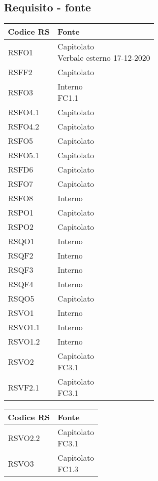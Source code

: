 {\subsection{Requisito - fonte}\label{RequisitiTracciamentoDeiRequisitiFonte}
\begin{center}
	\renewcommand{\arraystretch}{1.4}
	\begin{tabularx}{\textwidth}{ |X|X| }
		\hline
		\rowcolor{Melon}
		\textbf{Codice RS} & \textbf{Fonte}  \\
		\hline
RSFO1 & \makecell[tcX]{Capitolato\\Verbale esterno 17-12-2020} \\
\hline
RSFF2 & Capitolato\\
\hline
RSFO3 & \makecell[tcX]{Interno\\FC1.1}\\
\hline
RSFO4.1 & Capitolato\\
\hline
RSFO4.2 & Capitolato\\
\hline
RSFO5 & Capitolato\\
\hline
RSFO5.1 & Capitolato\\
\hline
RSFD6 & Capitolato\\
\hline
RSFO7 & Capitolato\\
\hline
RSFO8 & Interno\\
\hline
RSPO1 & Capitolato\\
\hline
RSPO2 & Capitolato\\
\hline
RSQO1 & Interno\\
\hline
RSQF2 & Interno\\
\hline
RSQF3 & Interno\\
\hline
RSQF4 & Interno\\
\hline
RSQO5 & Capitolato\\
\hline
RSVO1 & Interno\\
\hline
RSVO1.1 & Interno\\
\hline
RSVO1.2 & Interno\\
\hline
RSVO2 & \makecell[tcX]{Capitolato\\FC3.1}\\
\hline
RSVF2.1 & \makecell[tcX]{Capitolato\\FC3.1}\\
\hline
	\end{tabularx}
\end{center}
\begin{center}
	\renewcommand{\arraystretch}{1.4}
	\begin{tabularx}{\textwidth}{ |X|X| }
		\hline
		\rowcolor{Melon}
		\textbf{Codice RS} & \textbf{Fonte}  \\
		\hline
RSVO2.2 & \makecell[tcX]{Capitolato\\FC3.1}\\
\hline
RSVO3 & \makecell[tcX]{Capitolato\\FC1.3}\\
\hline
	\end{tabularx}
\end{center}

}
